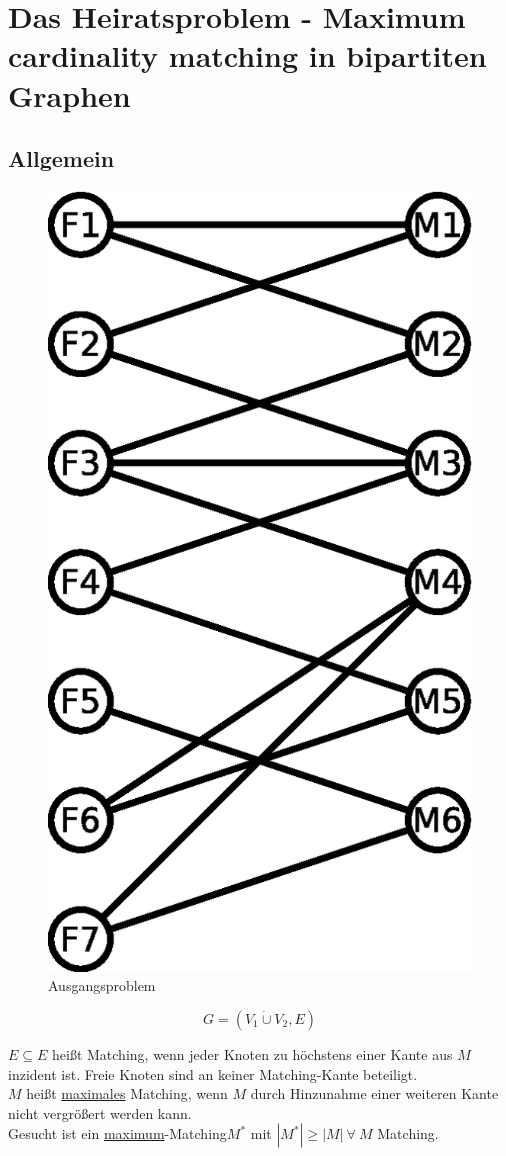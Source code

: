 \chapter[Das Heiratsproblem]{Das Heiratsproblem - Maximum cardinality matching in bipartiten Graphen}
\section{Allgemein}
\begin{figure}
\centering
\includegraphics[width=0.5\linewidth]{23/Grafik/Diagramm1}
\caption{Ausgangsproblem}
\label{fig:Diagramm1}
\end{figure}
\[ G=(V_1 \dot{\cup}V_2, E) \]

$E \subseteq E$ heißt Matching, wenn jeder Knoten zu höchstens einer Kante aus $M$ inzident ist. Freie Knoten sind an keiner Matching-Kante beteiligt.\\

$M$ heißt \underline{maximales} Matching, wenn $M$ durch Hinzunahme einer weiteren Kante nicht vergrößert werden kann.\\

Gesucht ist ein \underline{maximum}-Matching\linebreak[4] $M^*$ mit $|M^*| \geq |M|~\forall~M$ Matching.
\vspace{80pt}

